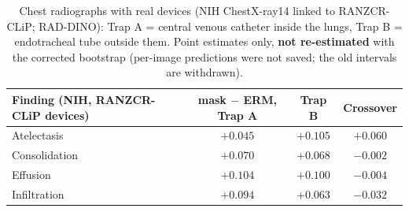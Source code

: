 \begin{table}[H]\centering\small
\caption{Chest radiographs with real devices (NIH ChestX-ray14 linked to RANZCR-CLiP; RAD-DINO): Trap A = central venous catheter inside the lungs, Trap B = endotracheal tube outside them. Point estimates only, \textbf{not re-estimated} with the corrected bootstrap (per-image predictions were not saved; the old intervals are withdrawn).}\label{tab:cxr}
\begin{tabular}{lccc}\toprule
Finding (NIH, RANZCR-CLiP devices) & mask $-$ ERM, Trap A & Trap B & Crossover \\\midrule
Atelectasis & $+0.045$ & $+0.105$ & $+0.060$ \\
Consolidation & $+0.070$ & $+0.068$ & $-0.002$ \\
Effusion & $+0.104$ & $+0.100$ & $-0.004$ \\
Infiltration & $+0.094$ & $+0.063$ & $-0.032$ \\
\bottomrule\end{tabular}
\end{table}
